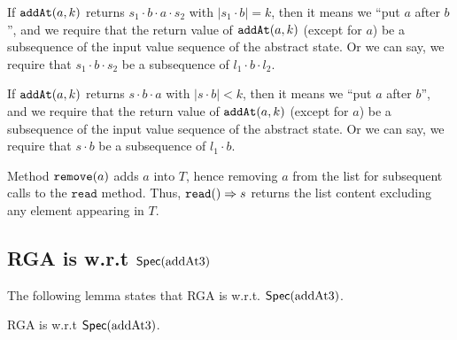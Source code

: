 If $\alabelshort[\mathtt{addAt}]{a,k}$ returns $s_1 \cdot b \cdot a \cdot s_2$ with $\vert s_1 \cdot b \vert = k$, then it means we ``put $a$ after $b$'', and we require that the return value of $\alabelshort[\mathtt{addAt}]{a,k}$ (except for $a$) be a subsequence of the input value sequence of the abstract state. Or we can say, we require that $s_1 \cdot b \cdot s_2$ be a subsequence of $l_1 \cdot b \cdot l_2$.

If $\alabelshort[\mathtt{addAt}]{a,k}$ returns $s \cdot b \cdot a$ with $\vert s \cdot b \vert < k$, then it means we ``put $a$ after $b$'', and we require that the return value of $\alabelshort[\mathtt{addAt}]{a,k}$ (except for $a$) be a subsequence of the input value sequence of the abstract state. Or we can say, we require that $s \cdot b$ be a subsequence of $l_1 \cdot b$.

Method $\alabelshort[\mathtt{remove}]{a}$ adds $a$ into $T$, hence removing $a$ from the list for subsequent calls to the $\mathtt{read}$ method. Thus, $\alabellong[\mathtt{read}]{}{s}{}$ returns the list content excluding any element appearing in $T$.






\subsection{RGA is \crdtlinearizable{} w.r.t $\specAddatThree$}
\label{subsec:RGA is RA-linearizable w.r.t specAddatThree} 

The following lemma states that RGA is \crdtlinearizable{} w.r.t. $\specAddatThree$.

\begin{lemma}
\label{lemma:RGA is RA-linearizable w.r.t SpecAddatThree}
RGA is \crdtlinearizable{} w.r.t $\specAddatThree$.
\end{lemma}

